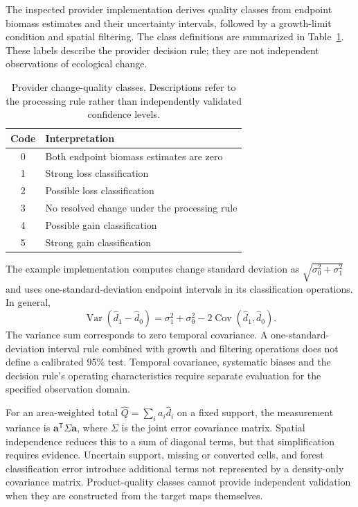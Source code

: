\documentclass[11pt,a4paper]{article}
\begin{document}
The inspected provider implementation derives quality classes from endpoint biomass estimates and their uncertainty intervals, followed by a growth-limit condition and spatial filtering. The class definitions are summarized in Table~\ref{tab:quality}. These labels describe the provider decision rule; they are not independent observations of ecological change.

\begin{table}[htbp]
\centering\small
\caption{Provider change-quality classes. Descriptions refer to the processing rule rather than independently validated confidence levels.}\label{tab:quality}
\begin{tabular}{cl}
\toprule
Code & Interpretation\\\midrule
0 & Both endpoint biomass estimates are zero\\
1 & Strong loss classification\\
2 & Possible loss classification\\
3 & No resolved change under the processing rule\\
4 & Possible gain classification\\
5 & Strong gain classification\\\bottomrule
\end{tabular}
\end{table}

The example implementation computes change standard deviation as $\sqrt{\sigma_0^2+\sigma_1^2}$ and uses one-standard-deviation endpoint intervals in its classification operations. In general,
\begin{equation}
\operatorname{Var}(\widehat d_1-\widehat d_0)=\sigma_1^2+\sigma_0^2-2\operatorname{Cov}(\widehat d_1,\widehat d_0).
\end{equation}
The variance sum corresponds to zero temporal covariance. A one-standard-deviation interval rule combined with growth and filtering operations does not define a calibrated 95\% test. Temporal covariance, systematic biases and the decision rule's operating characteristics require separate evaluation for the specified observation domain.

For an area-weighted total $\widehat Q=\sum_i a_i\widehat d_i$ on a fixed support, the measurement variance is $\boldsymbol a^\mathsf{T}\Sigma\boldsymbol a$, where $\Sigma$ is the joint error covariance matrix. Spatial independence reduces this to a sum of diagonal terms, but that simplification requires evidence. Uncertain support, missing or converted cells, and forest classification error introduce additional terms not represented by a density-only covariance matrix. Product-quality classes cannot provide independent validation when they are constructed from the target maps themselves.
\end{document}

